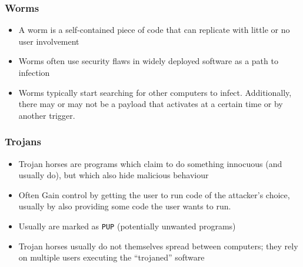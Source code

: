 \documentclass[twoside]{article}
\begin{document}
\subsubsection{Worms}
\begin{itemize}
\item A worm is a self-contained piece of code that can replicate with little or no user involvement
\item Worms often use security flaws in widely deployed software as a path to infection
\item Worms typically start searching for other computers to infect. Additionally, there may or may not be a payload that activates at a certain time or by another trigger.
\end{itemize}

\subsubsection{Trojans}
\begin{itemize}
\item Trojan horses are programs which claim to do something innocuous (and usually do), but which also hide malicious behaviour
\item Often Gain control by getting the user to run code of the attacker’s choice, usually by also providing some code the user wants to run. 
\item Usually are marked as \verb|PUP| (potentially unwanted programs)
\item Trojan horses usually do not themselves spread between computers; they rely on multiple users executing the “trojaned” software
\end{itemize}
\end{document}
